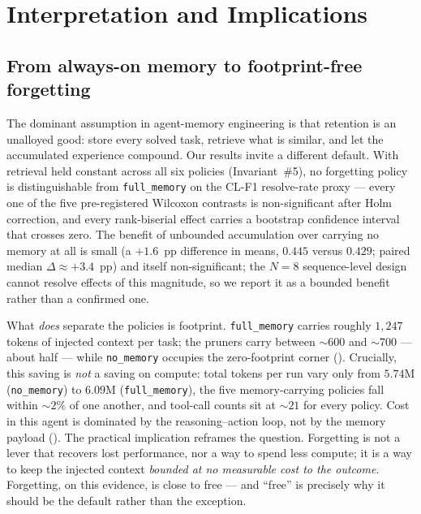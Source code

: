 

\section{Interpretation and Implications}

\subsection{From always-on memory to footprint-free forgetting}

The dominant assumption in agent-memory engineering is that retention is an
unalloyed good: store every solved task, retrieve what is similar, and let the
accumulated experience compound. Our results invite a different default. With
retrieval held constant across all six policies (Invariant~\#5), no forgetting
policy is distinguishable from \texttt{full\_memory} on the CL-F1 resolve-rate
proxy --- every one of the five pre-registered Wilcoxon contrasts is
non-significant after Holm correction, and every rank-biserial effect carries a
bootstrap confidence interval that crosses zero. The benefit of unbounded
accumulation over carrying no memory at all is small (a $+1.6$~pp difference in
means, $0.445$ versus $0.429$; paired median $\Delta \approx +3.4$~pp) and itself
non-significant; the $N=8$ sequence-level design cannot resolve effects of this
magnitude, so we report it as a bounded benefit rather than a confirmed one.

What \emph{does} separate the policies is footprint. \texttt{full\_memory} carries
roughly $1{,}247$ tokens of injected context per task; the pruners carry between
$\sim\!600$ and $\sim\!700$ --- about half --- while \texttt{no\_memory} occupies
the zero-footprint corner (). Crucially, this saving is
\emph{not} a saving on compute: total tokens per run vary only from $5.74$M
(\texttt{no\_memory}) to $6.09$M (\texttt{full\_memory}), the five memory-carrying
policies fall within $\sim\!2\%$ of one another, and tool-call counts sit at
$\sim\!21$ for every policy. Cost in this agent is dominated by the
reasoning--action loop, not by the memory payload (). The
practical implication reframes the question. Forgetting is not a lever that
recovers lost performance, nor a way to spend less compute; it is a way to keep the
injected context \emph{bounded at no measurable cost to the outcome}. Forgetting,
on this evidence, is close to free --- and ``free'' is precisely why it should be
the default rather than the exception.

